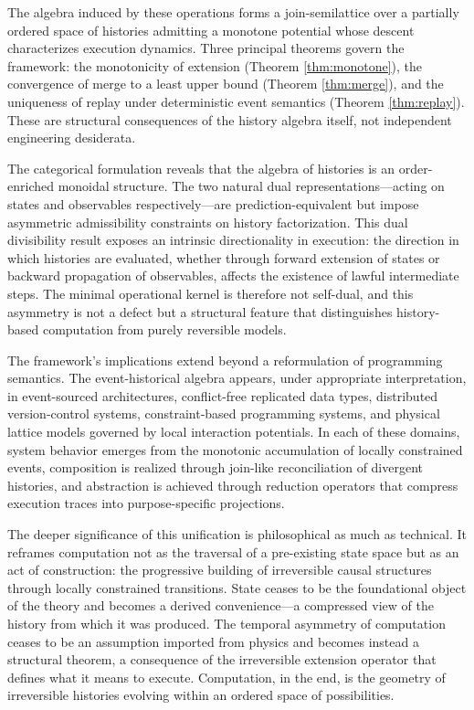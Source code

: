 \documentclass[12pt]{article}
\begin{document}
The algebra induced by these operations forms a join-semilattice over a partially ordered space
of histories admitting a monotone potential whose descent characterizes execution dynamics.
Three principal theorems govern the framework: the monotonicity of extension (Theorem
\ref{thm:monotone}), the convergence of merge to a least upper bound (Theorem \ref{thm:merge}),
and the uniqueness of replay under deterministic event semantics (Theorem \ref{thm:replay}).
These are structural consequences of the history algebra itself, not independent engineering
desiderata.

The categorical formulation reveals that the algebra of histories is an order-enriched monoidal
structure. The two natural dual representations---acting on states and observables
respectively---are prediction-equivalent but impose asymmetric admissibility constraints on
history factorization. This dual divisibility result exposes an intrinsic directionality in
execution: the direction in which histories are evaluated, whether through forward extension of
states or backward propagation of observables, affects the existence of lawful intermediate
steps. The minimal operational kernel is therefore not self-dual, and this asymmetry is not a
defect but a structural feature that distinguishes history-based computation from purely
reversible models.

The framework's implications extend beyond a reformulation of programming semantics. The
event-historical algebra appears, under appropriate interpretation, in event-sourced
architectures, conflict-free replicated data types, distributed version-control systems,
constraint-based programming systems, and physical lattice models governed by local interaction
potentials. In each of these domains, system behavior emerges from the monotonic accumulation
of locally constrained events, composition is realized through join-like reconciliation of
divergent histories, and abstraction is achieved through reduction operators that compress
execution traces into purpose-specific projections.

The deeper significance of this unification is philosophical as much as technical. It reframes
computation not as the traversal of a pre-existing state space but as an act of construction:
the progressive building of irreversible causal structures through locally constrained
transitions. State ceases to be the foundational object of the theory and becomes a derived
convenience---a compressed view of the history from which it was produced. The temporal
asymmetry of computation ceases to be an assumption imported from physics and becomes instead
a structural theorem, a consequence of the irreversible extension operator that defines what it
means to execute. Computation, in the end, is the geometry of irreversible histories evolving
within an ordered space of possibilities.
\end{document}
